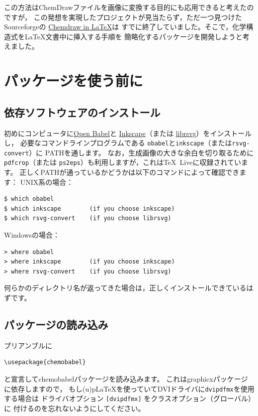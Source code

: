 \documentclass[12pt]{ltjsarticle}
\def\Lpack#1{\textsf{#1}}
\def\Lcode#1{\texttt{#1}}
\begin{document}
この方法はChemDrawファイルを画像に変換する目的にも応用できると考えたのですが，
この発想を実現したプロジェクトが見当たらず，ただ一つ見つけたSourceforgeの
\href{http://chemdrawinlatex.sourceforge.net/}{Chemdraw in \LaTeX}は
すでに終了していました。そこで，化学構造式を\LaTeX 文書中に挿入する手順を
簡略化するパッケージを開発しようと考えました。

\clearpage

\section{パッケージを使う前に}

\subsection{依存ソフトウェアのインストール}

初めにコンピュータに\href{http://openbabel.org/}{Open Babel}と
\href{https://inkscape.org/ja/}{Inkscape}（または
\href{http://librsvg.sourceforge.net/download/}{librsvg}）をインストールし，
必要なコマンドラインプログラムである
\Lcode{obabel}と\Lcode{inkscape}（または\Lcode{rsvg-convert}）に
PATHを通します。
なお，生成画像の大きな余白を切り取るために\Lcode{pdfcrop}（または
\Lcode{ps2eps}）も利用しますが，これは\TeX\ Liveに収録されています。
正しくPATHが通っているかどうかは以下のコマンドによって確認できます：
UNIX系の場合：
\begin{verbatim}
$ which obabel
$ which inkscape        (if you choose inkscape)
$ which rsvg-convert    (if you choose librsvg)
\end{verbatim}

Windowsの場合：
\begin{verbatim}
> where obabel
> where inkscape        (if you choose inkscape)
> where rsvg-convert    (if you choose librsvg)
\end{verbatim}

何らかのディレクトリ名が返ってきた場合は，正しくインストールできているはずです。

\subsection{パッケージの読み込み}

プリアンブルに
\begin{verbatim}
\usepackage{chemobabel}
\end{verbatim}
と宣言して\Lpack{chemobabel}パッケージを読み込みます。
これは\Lpack{graphicx}パッケージに依存しますので，
もし(u)p\LaTeX を使っていてDVIドライバに\Lcode{dvipdfmx}を使用する場合は
ドライバオプション \verb+[dvipdfmx]+ をクラスオプション（グローバル）に
付けるのを忘れないようにしてください。
\end{document}
